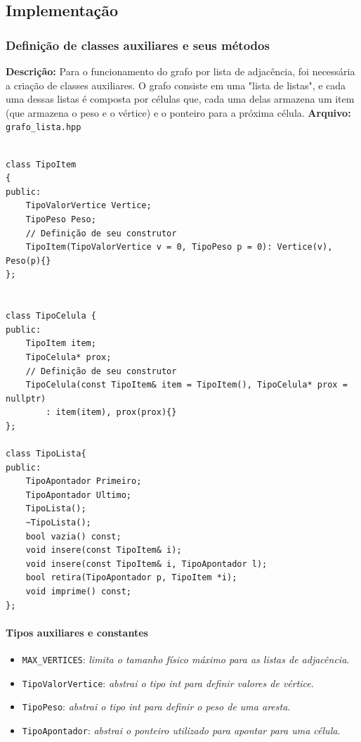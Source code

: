 \documentclass{article}
\begin{document}
\subsection*{Implementação}

\subsubsection*{Definição de classes auxiliares e seus métodos}

    \textbf{Descrição:} Para o funcionamento do grafo por lista de adjacência, foi necessária a criação de classes auxiliares. O grafo consiste em uma "lista de listas", e cada uma dessas listas é composta por células que, cada uma delas armazena um item (que armazena o peso e o vértice) e o ponteiro para a próxima célula.
\textbf{Arquivo:} \texttt{grafo\_lista.hpp}
\begin{verbatim}

class TipoItem
{
public:
    TipoValorVertice Vertice;
    TipoPeso Peso;
    // Definição de seu construtor
    TipoItem(TipoValorVertice v = 0, TipoPeso p = 0): Vertice(v), Peso(p){}
};


class TipoCelula {
public:
    TipoItem item;
    TipoCelula* prox;
    // Definição de seu construtor
    TipoCelula(const TipoItem& item = TipoItem(), TipoCelula* prox = nullptr)
        : item(item), prox(prox){}
};

class TipoLista{
public:
    TipoApontador Primeiro;
    TipoApontador Ultimo;
    TipoLista();
    ~TipoLista();
    bool vazia() const;
    void insere(const TipoItem& i);
    void insere(const TipoItem& i, TipoApontador l);
    bool retira(TipoApontador p, TipoItem *i);
    void imprime() const;
};
\end{verbatim}

\paragraph*{Tipos auxiliares e constantes}

\begin{itemize}
    \item \texttt{MAX\_VERTICES}: \textit{limita o tamanho físico máximo para as listas de adjacência}.
    \item \texttt{TipoValorVertice}: \textit{abstrai o tipo int para definir valores de vértice}.
    \item \texttt{TipoPeso}: \textit{abstrai o tipo int para definir o peso de uma aresta}.
    \item \texttt{TipoApontador}: \textit{abstrai o ponteiro utilizado para apontar para uma célula}.

    
\end{itemize}
\end{document}
